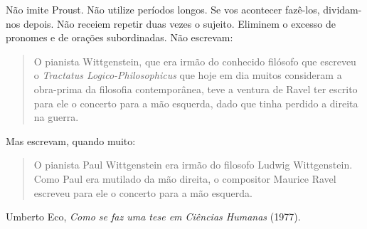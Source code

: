\begin{frame}
\small 
Não imite Proust. Não utilize períodos longos. Se vos acontecer fazê-los, 
dividam-nos depois. Não receiem repetir duas vezes o sujeito. 
Eliminem o excesso de pronomes e de orações subordinadas. Não escrevam:
\begin{quote}
O pianista Wittgenstein, que era irmão do conhecido filósofo que escreveu 
o \emph{Tractatus Logico-Philosophicus} que hoje em dia muitos consideram 
a obra-prima da filosofia contemporânea, teve a ventura de Ravel ter escrito 
para ele o concerto para a mão esquerda, dado que tinha perdido a direita na 
guerra.
\end{quote}
Mas escrevam, quando muito:
\begin{quote}
O pianista Paul Wittgenstein era irmão do filosofo Ludwig Wittgenstein. 
Como Paul era mutilado da mão direita, o compositor Maurice Ravel escreveu 
para ele o concerto para a mão esquerda.
\end{quote}
\begin{flushright}
Umberto Eco, \emph{Como se faz uma tese em Ciências Humanas} (1977).
\end{flushright}
\end{frame}
